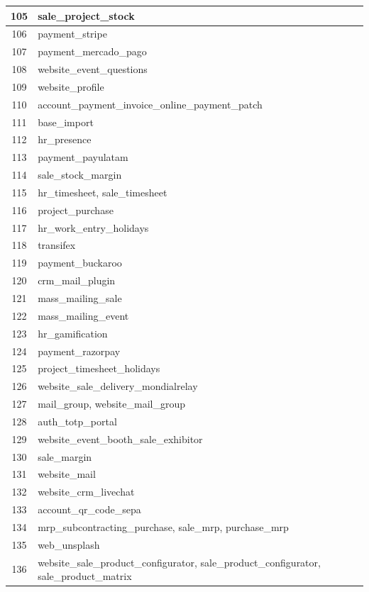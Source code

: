\begin{small}
\begin{longtable}{|c|p{14cm}|}
105 & sale{\_}project{\_}stock \\ \hline
106 & payment{\_}stripe \\ \hline
107 & payment{\_}mercado{\_}pago \\ \hline
108 & website{\_}event{\_}questions \\ \hline
109 & website{\_}profile \\ \hline
110 & account{\_}payment{\_}invoice{\_}online{\_}payment{\_}patch \\ \hline
111 & base{\_}import \\ \hline
112 & hr{\_}presence \\ \hline
113 & payment{\_}payulatam \\ \hline
114 & sale{\_}stock{\_}margin \\ \hline
115 & hr{\_}timesheet, sale{\_}timesheet \\ \hline
116 & project{\_}purchase \\ \hline
117 & hr{\_}work{\_}entry{\_}holidays \\ \hline
118 & transifex \\ \hline
119 & payment{\_}buckaroo \\ \hline
120 & crm{\_}mail{\_}plugin \\ \hline
121 & mass{\_}mailing{\_}sale \\ \hline
122 & mass{\_}mailing{\_}event \\ \hline
123 & hr{\_}gamification \\ \hline
124 & payment{\_}razorpay \\ \hline
125 & project{\_}timesheet{\_}holidays \\ \hline
126 & website{\_}sale{\_}delivery{\_}mondialrelay \\ \hline
127 & mail{\_}group, website{\_}mail{\_}group \\ \hline
128 & auth{\_}totp{\_}portal \\ \hline
129 & website{\_}event{\_}booth{\_}sale{\_}exhibitor \\ \hline
130 & sale{\_}margin \\ \hline
131 & website{\_}mail \\ \hline
132 & website{\_}crm{\_}livechat \\ \hline
133 & account{\_}qr{\_}code{\_}sepa \\ \hline
134 & mrp{\_}subcontracting{\_}purchase, sale{\_}mrp, purchase{\_}mrp \\ \hline
135 & web{\_}unsplash \\ \hline
136 & website{\_}sale{\_}product{\_}configurator, sale{\_}product{\_}configurator, sale{\_}product{\_}matrix \\ \hline

\end{longtable}
\end{small}
